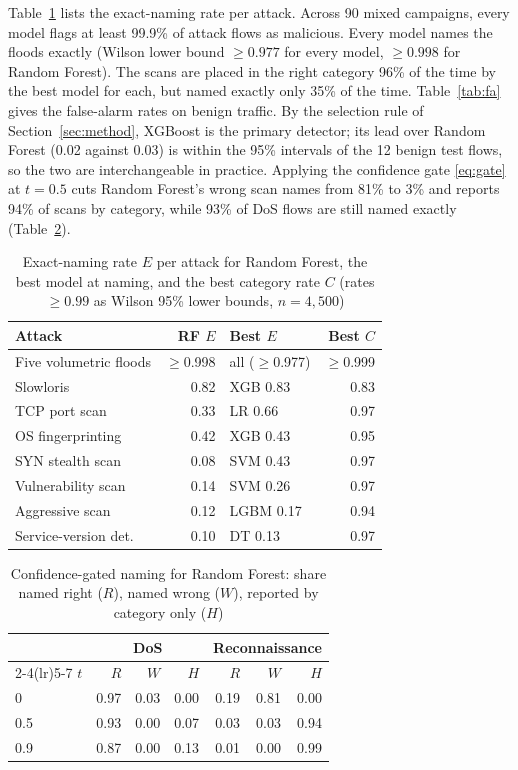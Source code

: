 \documentclass[conference]{IEEEtran}
\begin{document}
Table~\ref{tab:perattack} lists the exact-naming rate per attack. Across 90 mixed campaigns, every model flags at least 99.9\% of attack flows as malicious. Every model names the floods exactly (Wilson lower bound $\ge 0.977$ for every model, $\ge 0.998$ for Random Forest). The scans are placed in the right category 96\% of the time by the best model for each, but named exactly only 35\% of the time. Table~\ref{tab:fa} gives the false-alarm rates on benign traffic. By the selection rule of Section~\ref{sec:method}, XGBoost is the primary detector; its lead over Random Forest (0.02 against 0.03) is within the 95\% intervals of the 12 benign test flows, so the two are interchangeable in practice. Applying the confidence gate \eqref{eq:gate} at $t = 0.5$ cuts Random Forest's wrong scan names from 81\% to 3\% and reports 94\% of scans by category, while 93\% of DoS flows are still named exactly (Table~\ref{tab:gate}).

\begin{table}[!t]
\caption{Exact-naming rate $E$ per attack for Random Forest, the best model at naming, and the best category rate $C$ (rates $\ge 0.99$ as Wilson 95\% lower bounds, $n = 4{,}500$)}
\label{tab:perattack}
\centering
\footnotesize
\begin{tabular}{@{}lrlr@{}}
\toprule
\textbf{Attack} & \textbf{RF $E$} & \textbf{Best $E$} & \textbf{Best $C$} \\
\midrule
Five volumetric floods & $\ge$0.998 & all ($\ge$0.977) & $\ge$0.999 \\
Slowloris & 0.82 & XGB 0.83 & 0.83 \\
TCP port scan & 0.33 & LR 0.66 & 0.97 \\
OS fingerprinting & 0.42 & XGB 0.43 & 0.95 \\
SYN stealth scan & 0.08 & SVM 0.43 & 0.97 \\
Vulnerability scan & 0.14 & SVM 0.26 & 0.97 \\
Aggressive scan & 0.12 & LGBM 0.17 & 0.94 \\
Service-version det. & 0.10 & DT 0.13 & 0.97 \\
\bottomrule
\end{tabular}
\end{table}

\begin{table}[!t]
\caption{Confidence-gated naming for Random Forest: share named right ($R$), named wrong ($W$), reported by category only ($H$)}
\label{tab:gate}
\centering
\footnotesize
\begin{tabular}{@{}lrrrrrr@{}}
\toprule
 & \multicolumn{3}{c}{\textbf{DoS}} & \multicolumn{3}{c}{\textbf{Reconnaissance}} \\
\cmidrule(lr){2-4}\cmidrule(lr){5-7}
$t$ & $R$ & $W$ & $H$ & $R$ & $W$ & $H$ \\
\midrule
0   & 0.97 & 0.03 & 0.00 & 0.19 & 0.81 & 0.00 \\
0.5 & 0.93 & 0.00 & 0.07 & 0.03 & 0.03 & 0.94 \\
0.9 & 0.87 & 0.00 & 0.13 & 0.01 & 0.00 & 0.99 \\
\bottomrule
\end{tabular}
\end{table}
\end{document}
